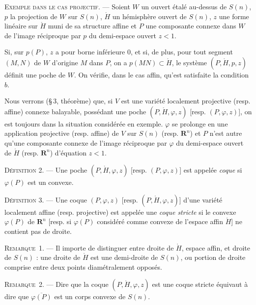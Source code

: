 \documentclass[11pt]{article}
\newcommand{\R}{\boldsymbol{R}}
\newcommand{\bzcf}[2]{#1}
\newcommand{\bznum}[1]{\if\relax\detokenize{#1}\relax\else\ #1\fi}
\newenvironment{defin}[1][]{\par\medskip\noindent\textsc{Définition #1.} --- }{\par\medskip}
\newenvironment{remarque}[1][]{\par\medskip\noindent\textsc{Remarque\bznum{#1}.} --- }{\par\medskip}
\newenvironment{exemple}[1][Exemple]{\par\medskip\noindent\textsc{#1.} --- }{\par\medskip}
\begin{document}
\begin{exemple}[Exemple dans le cas projectif]
Soient $W$ un ouvert étalé au-dessus de $S(n)$, $p$ la projection de $W$ sur $S(n)$,
$\mathring{H}$ un hémisphère ouvert de $S(n)$, $z$ une forme linéaire sur $\mathring{H}$ muni de
sa structure affine et $P$ une composante connexe dans $W$ de l'image réciproque par $p$ du
demi-espace ouvert $z<1$.

Si, sur $p(P)$, $z$ a pour borne inférieure $0$, et si, de plus, pour tout segment $(M, N)$ de
$W$ d'origine $M$ dans $P$, on a $p(MN)\subset\mathring{H}$, le système $(P, \mathring{H}, p, z)$
définit une poche de $W$. On vérifie, dans le cas affin, qu'est satisfaite la condition $b$.
\end{exemple}

Nous verrons (\bzcf{\S\,3, théorème}{\ref{bzthm:c2s3t1_poche_balayable}}) que, si $V$ est une
variété localement projective (resp. affine) connexe balayable, possédant une poche
$(P, \mathring{H}, \varphi, z)$ [resp. $(P, \varphi, z)$], on est toujours dans la situation
considérée en exemple. $\varphi$ se prolonge en une application projective (resp. affine) de $V$
sur $S(n)$ (resp. $\R^n$) et $P$ n'est autre qu'une composante connexe de l'image réciproque par
$\varphi$ du demi-espace ouvert de $\mathring{H}$ (resp. $\R^n$) d'équation $z<1$.

\begin{defin}[2]
Une poche $(P, \mathring{H}, \varphi, z)$ [resp. $(P, \varphi, z)$] est appelée \textit{coque} si
$\varphi(P)$ est un convexe.
\end{defin}

\begin{defin}[3]
Une coque $(P, \varphi, z)$ [resp. $(P, \mathring{H}, \varphi, z)$] d'une variété localement
affine (resp. projective) est appelée une \textit{coque stricte} si le convexe $\varphi(P)$ de
$\R^n$ [resp. si $\varphi(P)$ considéré comme convexe de l'espace affin $\mathring{H}$] ne contient
pas de droite.
\end{defin}

\begin{remarque}[1]
Il importe de distinguer entre droite de $\mathring{H}$, espace affin, et droite de $S(n)$ : une
droite de $\mathring{H}$ est une demi-droite de $S(n)$, ou portion de droite comprise entre deux
points diamétralement opposés.
\end{remarque}

\begin{remarque}[2]
Dire que la coque $(P, \mathring{H}, \varphi, z)$ est une coque stricte équivaut à dire que
$\overline{\varphi(P)}$ est un corps convexe de $S(n)$.
\end{remarque}
\end{document}
